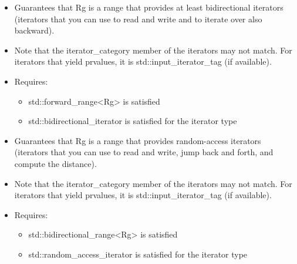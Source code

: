 
\begin{itemize}
\item
Guarantees that Rg is a range that provides at least bidirectional iterators (iterators that you can use to read and write and to iterate over also backward).

\item
Note that the iterator\_category member of the iterators may not match. For iterators that yield prvalues, it is std::input\_iterator\_tag (if available).

\item
Requires:

\begin{itemize}
\item
std::forward\_range<Rg> is satisfied

\item
std::bidirectional\_iterator is satisfied for the iterator type
\end{itemize}
\end{itemize}


\begin{itemize}
\item
Guarantees that Rg is a range that provides random-access iterators (iterators that you can use to read and write, jump back and forth, and compute the distance).

\item
Note that the iterator\_category member of the iterators may not match. For iterators that yield prvalues, it is std::input\_iterator\_tag (if available).

\item
Requires:

\begin{itemize}
\item
std::bidirectional\_range<Rg> is satisfied

\item
std::random\_access\_iterator is satisfied for the iterator type
\end{itemize}
\end{itemize}


